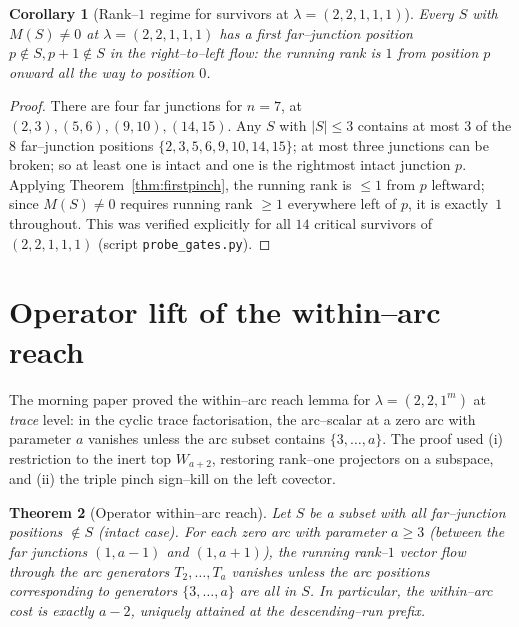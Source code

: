 \documentclass[11pt]{article}
\newtheorem{theorem}{Theorem}
\newtheorem{corollary}[theorem]{Corollary}
\theoremstyle{definition}
\newcommand{\la}{\lambda}
\newcommand{\W}{W}
\begin{document}
\begin{corollary}[Rank--$1$ regime for survivors at $\la=(2,2,1,1,1)$]\label{cor:r1}
Every $S$ with $M(S)\ne0$ at $\la=(2,2,1,1,1)$ has a first far--junction
position $p\notin S,p+1\notin S$ in the right--to--left flow: the running
rank is $1$ from position $p$ onward all the way to position $0$.
\end{corollary}

\begin{proof}
There are four far junctions for $n=7$, at $(2,3),(5,6),(9,10),(14,15)$. Any
$S$ with $|S|\le3$ contains at most $3$ of the $8$ far--junction positions
$\{2,3,5,6,9,10,14,15\}$; at most three junctions can be broken; so at least
one is intact and one is the rightmost intact junction $p$. Applying
Theorem~\ref{thm:firstpinch}, the running rank is $\le1$ from $p$ leftward;
since $M(S)\ne0$ requires running rank $\ge1$ everywhere left of $p$, it is
exactly~$1$ throughout. This was verified explicitly for all $14$ critical
survivors of $(2,2,1,1,1)$ (script \texttt{probe\_gates.py}).
\end{proof}

\section{Operator lift of the within--arc reach}

The morning paper proved the within--arc reach lemma for $\la=(2,2,1^m)$ at
\emph{trace} level: in the cyclic trace factorisation, the arc--scalar at a
zero arc with parameter $a$ vanishes unless the arc subset contains
$\{3,\dots,a\}$. The proof used (i) restriction to the inert top
$\W_{a+2}$, restoring rank--one projectors on a subspace, and (ii) the triple
pinch sign--kill on the left covector.

\begin{theorem}[Operator within--arc reach]\label{thm:opreach}
Let $S$ be a subset with all far--junction positions $\notin S$ (intact case).
For each zero arc with parameter $a\ge3$ (between the far junctions
$(1,a-1)$ and $(1,a+1)$), the running rank--$1$ vector flow through the arc
generators $T_2,\dots,T_a$ vanishes unless the arc positions corresponding to
generators $\{3,\dots,a\}$ are all in $S$. In particular, the within--arc cost
is exactly $a-2$, uniquely attained at the descending--run prefix.
\end{theorem}
\end{document}
